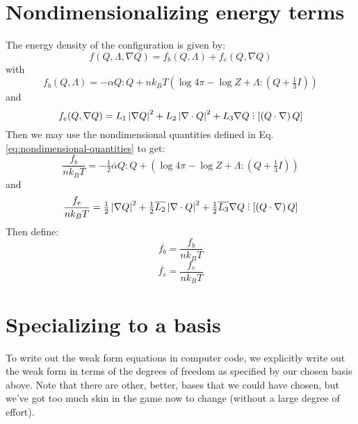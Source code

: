 \documentclass[reqno]{article}
\begin{document}
\section{Nondimensionalizing energy terms}
The energy density of the configuration is given by:
\begin{equation}
    f(Q, \Lambda, \nabla Q)
    = 
    f_b (Q, \Lambda)
    + f_e (Q, \nabla Q)
\end{equation}
with
\begin{equation}
    f_b(Q, \Lambda)
    =
    - \alpha Q : Q + n k_B T \left( \log 4 \pi - \log Z + \Lambda : (Q + \tfrac13 I) \right)
\end{equation}
and
\begin{equation}
    f_e (Q, \nabla Q)
    =
    L_1 \left| \nabla Q \right|^2
    + L_2 \left| \nabla \cdot Q \right|^2
    + L_3 \nabla Q \divby \left[ \left( Q \cdot \nabla \right) Q \right]
\end{equation}
Then we may use the nondimensional quantities defined in Eq. \eqref{eq:nondimensional-quantities} to get:
\begin{equation}
    \frac{f_b}{n k_B T} 
    = 
    - \tfrac12 \overline{\alpha} Q : Q 
    + \left( \log 4 \pi - \log Z + \Lambda : \left( Q + \tfrac13 I \right) \right)
\end{equation}
and
\begin{equation}
    \frac{f_e}{n k_B T} 
    = 
    \tfrac12 \left| \nabla Q \right|^2
    + \tfrac12 \overline{L_2} \left| \nabla \cdot Q \right|^2
    + \tfrac12 \overline{L_3} \nabla Q \divby \left[ \left( Q \cdot \nabla \right) Q \right]
\end{equation}
Then define:
\begin{equation}
    \overline{f_b} = \frac{f_b}{n k_B T}
\end{equation}
\begin{equation}
    \overline{f_e} = \frac{f_e}{n k_B T}
\end{equation}

\section{Specializing to a basis}
To write out the weak form equations in computer code, we explicitly write out the weak form in terms of the degrees of freedom as specified by our chosen basis above.
Note that there are other, better, bases that we could have chosen, but we've got too much skin in the game now to change (without a large degree of effort).
\end{document}
